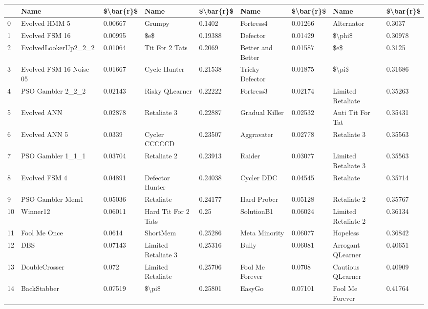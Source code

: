 \begin{tabular}{lllllllll}
\toprule
{} &                     Name & \$\textbackslash bar\{r\}\$ &                 Name & \$\textbackslash bar\{r\}\$ &               Name & \$\textbackslash bar\{r\}\$ &                 Name & \$\textbackslash bar\{r\}\$ \\
\midrule
0  &            Evolved HMM 5 &   0.00667 &               Grumpy &    0.1402 &          Fortress4 &   0.01266 &           Alternator &    0.3037 \\
1  &           Evolved FSM 16 &   0.00995 &                  \$e\$ &   0.19388 &           Defector &   0.01429 &               \$\textbackslash phi\$ &   0.30978 \\
2  &     EvolvedLookerUp2\_2\_2 &   0.01064 &       Tit For 2 Tats &    0.2069 &  Better and Better &   0.01587 &                  \$e\$ &    0.3125 \\
3  &  Evolved FSM 16 Noise 05 &   0.01667 &         Cycle Hunter &   0.21538 &    Tricky Defector &   0.01875 &                \$\textbackslash pi\$ &   0.31686 \\
4  &        PSO Gambler 2\_2\_2 &   0.02143 &       Risky QLearner &   0.22222 &          Fortress3 &   0.02174 &    Limited Retaliate &   0.35263 \\
5  &              Evolved ANN &   0.02878 &          Retaliate 3 &   0.22887 &     Gradual Killer &   0.02532 &     Anti Tit For Tat &   0.35431 \\
6  &            Evolved ANN 5 &    0.0339 &        Cycler CCCCCD &   0.23507 &         Aggravater &   0.02778 &          Retaliate 3 &   0.35563 \\
7  &        PSO Gambler 1\_1\_1 &   0.03704 &          Retaliate 2 &   0.23913 &             Raider &   0.03077 &  Limited Retaliate 3 &   0.35563 \\
8  &            Evolved FSM 4 &   0.04891 &      Defector Hunter &   0.24038 &         Cycler DDC &   0.04545 &            Retaliate &   0.35714 \\
9  &         PSO Gambler Mem1 &   0.05036 &            Retaliate &   0.24177 &        Hard Prober &   0.05128 &          Retaliate 2 &   0.35767 \\
10 &                 Winner12 &   0.06011 &  Hard Tit For 2 Tats &      0.25 &         SolutionB1 &   0.06024 &  Limited Retaliate 2 &   0.36134 \\
11 &             Fool Me Once &    0.0614 &             ShortMem &   0.25286 &      Meta Minority &   0.06077 &             Hopeless &   0.36842 \\
12 &                      DBS &   0.07143 &  Limited Retaliate 3 &   0.25316 &              Bully &   0.06081 &    Arrogant QLearner &   0.40651 \\
13 &            DoubleCrosser &     0.072 &    Limited Retaliate &   0.25706 &    Fool Me Forever &    0.0708 &    Cautious QLearner &   0.40909 \\
14 &              BackStabber &   0.07519 &                \$\textbackslash pi\$ &   0.25801 &             EasyGo &   0.07101 &      Fool Me Forever &   0.41764 \\
\bottomrule
\end{tabular}
